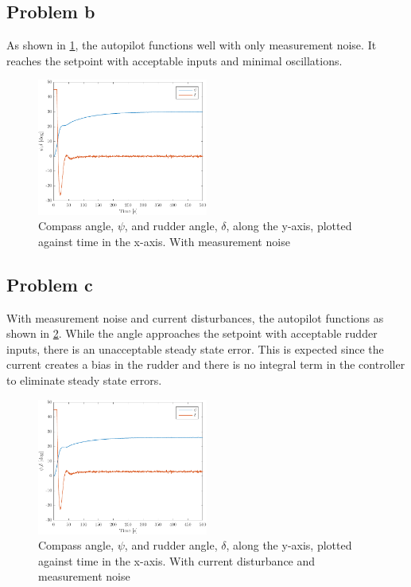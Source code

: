 \subsection{Problem b}
As shown in \cref{fig:3b-psi_and_rudder}, the autopilot functions well with only measurement noise.  It reaches the setpoint with acceptable inputs and minimal oscillations.

\begin{figure}[ht]
    \centering
    \includegraphics[width=0.5\textwidth]{images/3b-psi_and_rudder}
    \caption{Compass angle, $\psi$, and rudder angle, $\delta$, along the y-axis, plotted against time in the x-axis. With measurement noise}
    \label{fig:3b-psi_and_rudder}
\end{figure}

\subsection{Problem c}
With measurement noise and current disturbances, the autopilot functions as shown in \cref{fig:3b-psi_and_rudder_w_current}. While the angle approaches the setpoint with acceptable rudder inputs, there is an unacceptable steady state error. This is expected since the current creates a bias in the rudder and there is no integral term in the controller to eliminate steady state errors.

\begin{figure}[ht]
    \centering
    \includegraphics[width=0.5\textwidth]{images/3c-psi_and_rudder_w_current}
    \caption{Compass angle, $\psi$, and rudder angle, $\delta$, along the y-axis, plotted against time in the x-axis. With current disturbance and measurement noise}
    \label{fig:3b-psi_and_rudder_w_current}
\end{figure}

